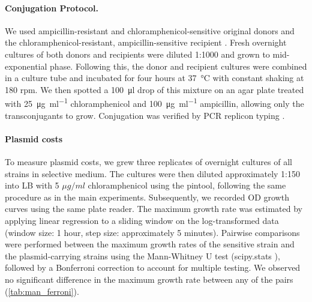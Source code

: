 \paragraph{Conjugation Protocol.\label{par: conj_protocol}}
We used ampicillin-resistant and chloramphenicol-sensitive original donors \cite{Sutter2016, Huisman2022Conjugation} and the chloramphenicol-resistant, ampicillin-sensitive recipient \cite{Feher2012}.
Fresh overnight cultures of both donors and recipients were diluted 1:1000 and grown to mid-exponential phase.
Following this, the donor and recipient cultures were combined in a culture tube and incubated for four hours at \SI{37}{\celsius} with constant shaking at 180 rpm.
We then spotted a \SI{100}{\micro \litre} drop of this mixture on an agar plate treated with \SI{25}{\micro \gram \per \milli \litre} chloramphenicol and \SI{100}{\micro \gram \per \milli \litre} ampicillin, allowing only the transconjugants to grow.
Conjugation was verified by PCR replicon typing \cite{Carattoli2005}.

\paragraph{Plasmid costs}
To measure plasmid costs, we grew three replicates of overnight cultures of all strains in selective medium.
The cultures were then diluted approximately 1:150 into LB with 5 $\mu g/ml$ chloramphenicol using the pintool, following the same procedure as in the main experiments.
Subsequently, we recorded OD growth curves using the same plate reader.
The maximum growth rate was estimated by applying linear regression to a sliding window on the log-transformed data (window size: 1 hour, step size: approximately 5 minutes).
Pairwise comparisons were performed between the maximum growth rates of the sensitive strain and the plasmid-carrying strains using the Mann-Whitney U test (scipy.stats \cite{Virtanen2020}), followed by a Bonferroni correction to account for multiple testing.
We observed no significant difference in the maximum growth rate between any of the pairs (\autoref{tab:man_ferroni}).

